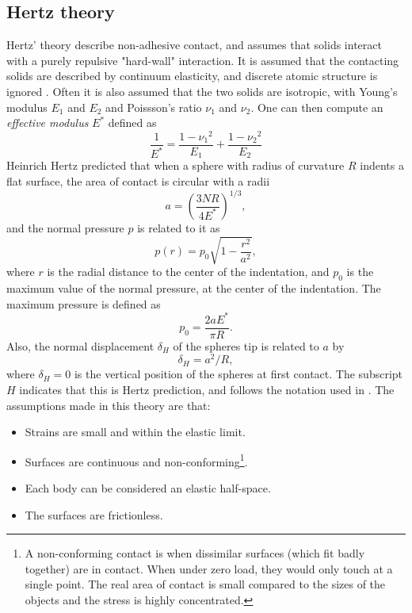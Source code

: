 \documentclass[twoside,english]{uiofysmaster}
\newcommand\lr[1]{\left(#1\right)}
\begin{document}
\subsection{Hertz theory} \label{sec:hertzTheory}
Hertz' theory describe non-adhesive contact, and assumes that solids interact with a purely repulsive "hard-wall" interaction.
It is assumed that the contacting solids are described by continuum elasticity, and discrete atomic structure is ignored \cite{RobbinsSingleAsperity}. 
Often it is also assumed that the two solids are isotropic, with Young's modulus $E_1$ and $E_2$ and Poissson's ratio $\nu_1$ and $\nu_2$. 
One can then compute an \textit{effective modulus} $E^*$ defined as
\begin{equation}
\frac{1}{E^*} = \frac{1-{\nu_1}^2}{E_1} + \frac{1-{\nu_2}^2}{E_2} \label{eq:effectiveModulus}
\end{equation}
Heinrich Hertz predicted that when a sphere with radius of curvature $R$ indents a flat surface, the area of contact is circular with a radii \cite{Johnson1985}
\begin{equation}
a = \lr{\frac{3NR}{4E^*}}^{1/3}, \label{eq:HertzRadii}
\end{equation}
and the normal pressure $p$ is related to it as
\begin{equation}
p(r) = p_0\sqrt{1-\frac{r^2}{a^2}}, \label{eq:HertzPressure}
\end{equation}
where $r$ is the radial distance to the center of the indentation, and
$p_0$ is the maximum value of the normal pressure, at the center of the indentation. 
The maximum pressure is defined as
\begin{equation}
	p_0 = \frac{2aE^*}{\pi R}. \label{eq:HertzMaxPressure}
\end{equation}
Also, the normal displacement $\delta_H$ of the spheres tip is related to $a$ by
\begin{equation}
\delta_H = a^2/R,
\end{equation}
where $\delta_H=0$ is the vertical position of the spheres at first contact.
The subscript $H$ indicates that this is Hertz prediction, and follows the notation used in \cite{Johnson1985}.
The assumptions made in this theory are that: 
\begin{itemize}
	\item Strains are small and within the elastic limit.
	\item Surfaces are continuous and non-conforming\footnote{
		A non-conforming contact is when dissimilar surfaces (which fit badly together) are in contact. When under zero load, they would only touch at a single point. 
		The real area of contact is small compared to the sizes of the objects and the stress is highly concentrated.}.
	\item Each body can be considered an elastic half-space.
	\item The surfaces are frictionless.
\end{itemize}
\end{document}
